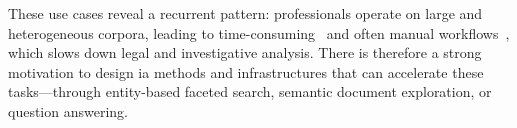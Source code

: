 These use cases reveal a recurrent pattern: professionals operate on large and
heterogeneous corpora, leading to time-consuming~\cite{pirzada2024framework}
and often manual workflows~\cite{buey2016}, which slows down legal and
investigative analysis. There is therefore a strong motivation to design \acl{ia}
methods and infrastructures that can accelerate these tasks---\eg through
entity-based faceted search, semantic document exploration, or question answering.







